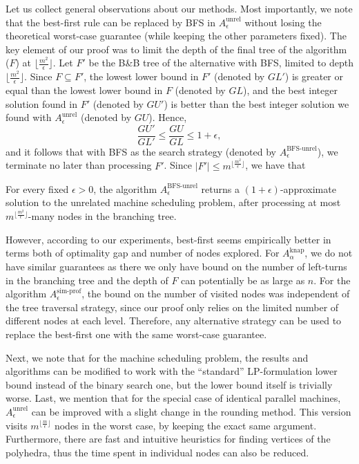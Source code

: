 \documentclass[a4paper,UKenglish,cleveref, autoref, thm-restate, pdfa]{lipics-v2021}
\theoremstyle{plain}
\begin{document}
Let us collect general observations about our methods. Most importantly, we note that the best-first rule can be replaced by BFS in $A^{\text{unrel}}_{\epsilon}$ without losing the theoretical worst-case guarantee (while keeping the other parameters fixed). The key element of our proof was to limit the depth of the final tree of the algorithm ($F$) at $\lfloor\frac{m^2}{\epsilon}\rfloor$. Let $F'$ be the B\&B tree of the alternative with BFS, limited to depth $\lfloor\frac{m^2}{\epsilon}\rfloor$. Since $F \subseteq F'$, the lowest lower bound in $F'$ (denoted by $GL'$) is greater or equal than the lowest lower bound in $F$ (denoted by $GL$), and the best integer solution found in $F'$ (denoted by $GU'$) is better than the best integer solution we found with $A^{\text{unrel}}_{\epsilon}$ (denoted by $GU$). Hence,
\[
\frac{GU'}{GL'} \le \frac{GU}{GL}\le 1+\epsilon,
\]
and it follows that with BFS as the search strategy (denoted by $A^{\text{BFS-unrel}}_{\epsilon}$), we terminate no later than processing $F'$. Since $|F'|\le m^{\lfloor\frac{m^2}{\epsilon}\rfloor}$, we have that

\begin{prop}\label{bfs}
    For every fixed $\epsilon > 0$, the algorithm $A^{\text{BFS-unrel}}_{\epsilon}$ returns a $(1+\epsilon)$-approximate solution to the unrelated machine scheduling problem, after processing at most $m^{\lfloor\frac{m^2}{\epsilon}\rfloor}$-many nodes in the branching tree.
\end{prop}

However, according to our experiments, best-first seems empirically better in terms both of optimality gap and number of nodes explored. For $A^{\text{knap}}_{\alpha}$, we do not have similar guarantees as there we only have bound on the number of left-turns in the branching tree and the depth of $F$ can potentially be as large as $n$. For the algorithm $A^{\text{sim-prof}}_{\epsilon}$, the bound on the number of visited nodes was independent of the tree traversal strategy, since our proof only relies on the limited number of different nodes at each level. Therefore, any alternative strategy can be used to replace the best-first one with the same worst-case guarantee.

Next, we note that for the machine scheduling problem, the results and algorithms can be modified to work with the ``standard'' LP-formulation lower bound instead of the binary search one, but the lower bound itself is trivially worse. Last, we mention that for the special case of identical parallel machines, $A_{\epsilon}^{\text{unrel}}$ can be improved with a slight change in the rounding method. This version visits $m^{\lfloor \frac{m}{\epsilon}\rfloor}$ nodes in the worst case, by keeping the exact same argument. Furthermore, there are fast and intuitive heuristics for finding vertices of the polyhedra, thus the time spent in individual nodes can also be reduced.
\end{document}
